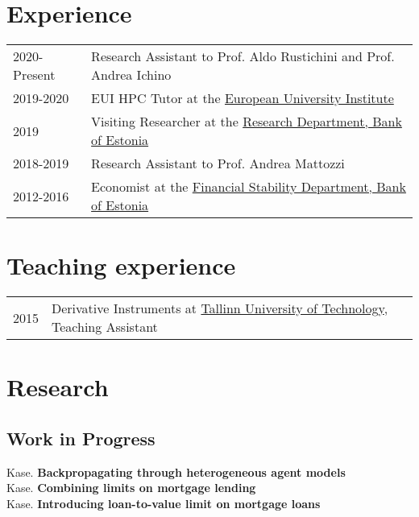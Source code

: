 \documentclass[a4, 11pt]{article}
\begin{document}
    \section*{Experience}
  \begin{table}[H]
      \begin{tabular}{p{2.5cm}p{13.5cm}}
          2020-Present & Research Assistant  {to Prof. Aldo Rustichini and Prof. Andrea Ichino} \\
          2019-2020 & EUI HPC Tutor at the  \href{https://www.eui.eu/ServicesAndAdmin/ComputingService/HeavyComputationalTasks}{European University Institute} \\
          2019 & Visiting Researcher at the  \href{https://www.eestipank.ee/en}{Research Department, Bank of Estonia} \\
          2018-2019 & Research Assistant  {to Prof. Andrea Mattozzi} \\
          2012-2016 & Economist at the  \href{https://www.eestipank.ee/en}{Financial Stability Department, Bank of Estonia} \\
      \end{tabular}
    \end{table}


    \section*{Teaching experience}
  \begin{table}[H]
      \begin{tabular}{p{2cm}p{14cm}}
          2015 & {Derivative Instruments} at \href{https://www.ttu.ee/en}{Tallinn University of Technology}, Teaching Assistant\\
      \end{tabular}
    \end{table}


    \section*{Research}\subsection*{Work in Progress}
      Kase. \textbf{Backpropagating through heterogeneous agent models}\\
      Kase. \textbf{Combining limits on mortgage lending}\\
      Kase. \textbf{Introducing loan-to-value limit on mortgage loans}\\
\end{document}
